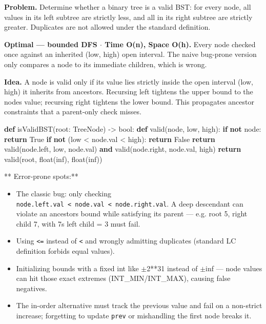 \documentclass[11pt]{article}
\providecommand{\tightlist}{\setlength{\itemsep}{1pt}\setlength{\parskip}{0pt}}
\newenvironment{Shaded}{\begin{snugshade}}{\end{snugshade}}
\newcommand{\BuiltInTok}[1]{\textcolor[rgb]{0.50,0.55,0.55}{#1}}
\newcommand{\ControlFlowTok}[1]{\textcolor[rgb]{0.99,0.74,0.29}{\textbf{#1}}}
\newcommand{\KeywordTok}[1]{\textcolor[rgb]{0.81,0.81,0.76}{\textbf{#1}}}
\newcommand{\NormalTok}[1]{\textcolor[rgb]{0.81,0.81,0.76}{#1}}
\newcommand{\OperatorTok}[1]{\textcolor[rgb]{0.81,0.81,0.76}{#1}}
\newcommand{\StringTok}[1]{\textcolor[rgb]{0.96,0.31,0.31}{#1}}
\newcommand{\VariableTok}[1]{\textcolor[rgb]{0.15,0.68,0.68}{#1}}
\begin{document}
\textbf{Problem.} Determine whether a binary tree is a valid BST: for every node, all values in its left subtree are strictly less, and all in its right subtree are strictly greater. Duplicates are not allowed under the standard definition.

\textbf{Optimal --- bounded DFS \(\cdot\) Time O(n), Space O(h).} Every node checked once against an inherited (low, high) open interval. The naive bug-prone version only compares a node to its immediate children, which is wrong.

\textbf{Idea.} A node is valid only if its value lies strictly inside the open interval (low, high) it inherits from ancestors. Recursing left tightens the upper bound to the node\textquotesingle s value; recursing right tightens the lower bound. This propagates ancestor constraints that a parent-only check misses.


\begin{Shaded}
\begin{Highlighting}[]
\KeywordTok{def}\NormalTok{ isValidBST(root: TreeNode) }\OperatorTok{{-}\textgreater{}} \BuiltInTok{bool}\NormalTok{:}
    \KeywordTok{def}\NormalTok{ valid(node, low, high):}
        \ControlFlowTok{if} \KeywordTok{not}\NormalTok{ node:}
            \ControlFlowTok{return} \VariableTok{True}
        \ControlFlowTok{if} \KeywordTok{not}\NormalTok{ (low }\OperatorTok{\textless{}}\NormalTok{ node.val }\OperatorTok{\textless{}}\NormalTok{ high):}
            \ControlFlowTok{return} \VariableTok{False}
        \ControlFlowTok{return}\NormalTok{ valid(node.left, low, node.val) }\KeywordTok{and}\NormalTok{ valid(node.right, node.val, high)}
    \ControlFlowTok{return}\NormalTok{ valid(root, }\BuiltInTok{float}\NormalTok{(}\StringTok{\textquotesingle{}{-}inf\textquotesingle{}}\NormalTok{), }\BuiltInTok{float}\NormalTok{(}\StringTok{\textquotesingle{}inf\textquotesingle{}}\NormalTok{))}
\end{Highlighting}
\end{Shaded}

** Error-prone spots:**

\begin{itemize}
\tightlist
\item
  The classic bug: only checking \texttt{node.left.val\ \textless{}\ node.val\ \textless{}\ node.right.val}. A deep descendant can violate an ancestor\textquotesingle s bound while satisfying its parent --- e.g. root 5, right child 7, with 7\textquotesingle s left child = 3 must fail.
\item
  Using \texttt{\textless{}=} instead of \texttt{\textless{}} and wrongly admitting duplicates (standard LC definition forbids equal values).
\item
  Initializing bounds with a fixed int like \(\pm\)2**31 instead of \(\pm\)inf --- node values can hit those exact extremes (INT\_MIN/INT\_MAX), causing false negatives.
\item
  The in-order alternative must track the previous value and fail on a non-strict increase; forgetting to update \texttt{prev} or mishandling the first node breaks it.
\end{itemize}
\end{document}
